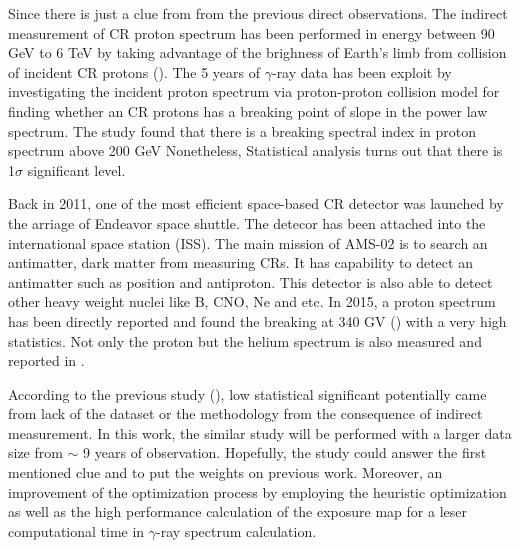 Since there is just a clue from from the previous direct observations.
The indirect measurement of CR proton spectrum has been performed in
energy between 90 GeV to 6 TeV by taking advantage of the brighness of
Earth's limb from collision of incident CR protons (\cite{FermiEarth14}).
The 5 years of $\gamma$-ray data has been exploit by investigating the 
incident proton spectrum via proton-proton collision model for finding 
whether an CR protons has a breaking point of slope in the power 
law spectrum. The study found that there is a breaking spectral index
in proton spectrum above 200 GeV 
Nonetheless, Statistical analysis turns out that there is 1$\sigma$
significant level.


Back in 2011, one of the most efficient
space-based CR detector was launched by the arriage of Endeavor
space shuttle. The detecor has been attached into the international 
space station (ISS). The main mission of AMS-02 is to search an 
antimatter, dark matter from measuring CRs. It has capability to
detect an antimatter such as position and antiproton. This detector
is also able to detect other heavy weight nuclei like B, CNO,
Ne and etc. In 2015, a proton spectrum has been directly
reported and found the breaking at 340 GV (\cite{AMS02pr2015})
with a very high statistics. Not only the proton but the helium spectrum
is also measured and reported in \cite{Heliumflux2015}. 



According to the previous study (\cite{FermiEarth14}), 
low statistical significant potentially came from lack of the 
dataset or the methodology from the consequence of indirect
measurement. In this work, the similar study will be performed with 
a larger data size from $\sim$ 9 years of observation. Hopefully, 
the study could answer the first mentioned clue and to put the weights
on previous work. Moreover, an improvement of the optimization
process by employing the heuristic optimization as well as the
high performance calculation of the exposure map for a leser
computational time in $\gamma$-ray spectrum calculation. 
